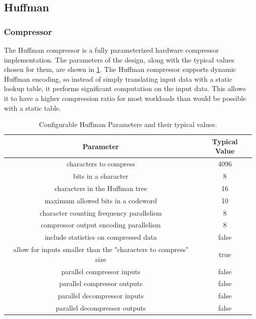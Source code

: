 \documentclass[doublespace,nopageskip]{VTthesis}
\begin{document}
\subsection{Huffman}\label{ss:huffman}
\subsubsection{Compressor}\label{sss:compressor}
The Huffman compressor is a fully parameterized hardware compressor implementation. The parameters of the design, along with the typical values chosen for them, are shown in \ref{tab:huffman-configuration-table}. The Huffman compressor supports dynamic Huffman encoding, so instead of simply translating input data with a static lookup table, it performs significant computation on the input data. This allows it to have a higher compression ratio for most workloads than would be possible with a static table.

\begin{table}[htb]
	\centering
	\caption{Configurable Huffman Parameters and their typical values.}
	\begin{tabular}{|c|c|}
	    \hline
	    Parameter & Typical Value \\
	    \hline
	    characters to compress & 4096 \\
	    \hline
	    bits in a character & 8 \\
	    \hline
	    characters in the Huffman tree & 16 \\
	    \hline
	    maximum allowed bits in a codeword & 10 \\
	    \hline
	    character counting frequency parallelism & 8 \\
	    \hline
	    compressor output encoding parallelism & 8 \\
	    \hline
	    include statistics on compressed data & false \\
	    \hline
	    allow for inputs smaller than the "characters to compress" size & true \\
	    \hline
	    parallel compressor inputs & false \\
	    \hline
	    parallel compressor outputs & false \\
	    \hline
	    parallel decompressor inputs & false \\ 
	    \hline
	    parallel decompressor outputs & false \\
	    \hline
	\end{tabular}
	\label{tab:huffman-configuration-table}
\end{table}
\end{document}
